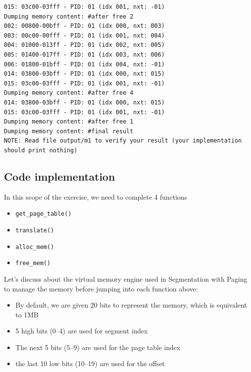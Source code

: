 \documentclass[a4paper]{article}
\numberwithin{equation}{section}
\begin{document}
\begin{mdframed}[leftline=false,rightline=false,backgroundcolor=teal!10,nobreak=false]
\begin{verbatim}
015: 03c00-03fff - PID: 01 (idx 001, nxt: -01)
Dumping memory content: #after free 2
002: 00800-00bff - PID: 01 (idx 000, nxt: 003)
003: 00c00-00fff - PID: 01 (idx 001, nxt: 004)
004: 01000-013ff - PID: 01 (idx 002, nxt: 005)
005: 01400-017ff - PID: 01 (idx 003, nxt: 006)
006: 01800-01bff - PID: 01 (idx 004, nxt: -01)
014: 03800-03bff - PID: 01 (idx 000, nxt: 015)
015: 03c00-03fff - PID: 01 (idx 001, nxt: -01)
Dumping memory content: #after free 4
014: 03800-03bff - PID: 01 (idx 000, nxt: 015)
015: 03c00-03fff - PID: 01 (idx 001, nxt: -01)
Dumping memory content: #after free 1
Dumping memory content: #final result
NOTE: Read file output/m1 to verify your result (your implementation should print nothing)
  \end{verbatim}
\end{mdframed}

\newpage
\subsection{Code implementation}
In this scope of the exercise, we need to complete 4 functions
\begin{itemize}
  \item \texttt{get_page_table()}
  \item \texttt{translate()}
  \item \texttt{alloc_mem()}
  \item \texttt{free_mem()}
\end{itemize}

Let's discuss about the virtual memory engine used in Segmentation with Paging to manage the memory before jumping into each function above:
\begin{itemize}
  \item By default, we are given 20 bits to represent the memory, which is equivalent to 1MB
  \item 5 high bits (0--4)  are used for segment index
  \item The next 5 bits (5--9) are used for the page table index
  \item the last 10 low bits (10--19) are used for the offset
\end{itemize}
\end{document}
